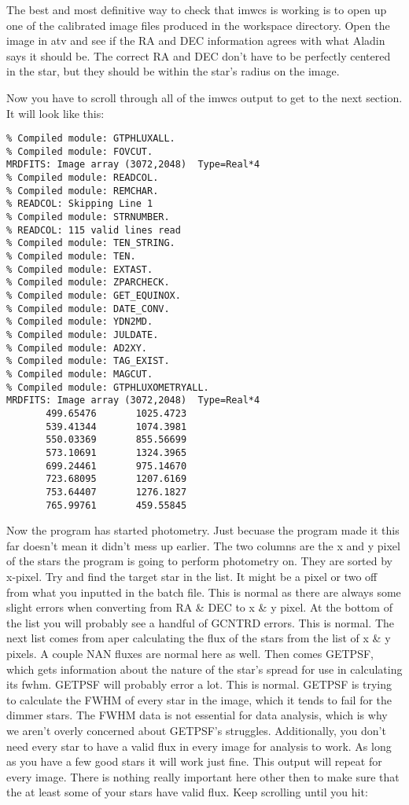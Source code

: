 \documentclass[10pt,preprint]{aastex}
\begin{document}
The best and most definitive way to check that imwcs is working is to open up one of the calibrated image files produced in the workspace directory. Open the image in atv and see if the RA and DEC information agrees with what Aladin says it should be. The correct RA and DEC don't have to be perfectly centered in the star, but they  should be within the star's radius on the image.

Now you have to scroll through all of the imwcs output to get to the next section. It will look like this:

\begin{verbatim}
% Compiled module: GTPHLUXALL.
% Compiled module: FOVCUT.
MRDFITS: Image array (3072,2048)  Type=Real*4
% Compiled module: READCOL.
% Compiled module: REMCHAR.
% READCOL: Skipping Line 1
% Compiled module: STRNUMBER.
% READCOL: 115 valid lines read
% Compiled module: TEN_STRING.
% Compiled module: TEN.
% Compiled module: EXTAST.
% Compiled module: ZPARCHECK.
% Compiled module: GET_EQUINOX.
% Compiled module: DATE_CONV.
% Compiled module: YDN2MD.
% Compiled module: JULDATE.
% Compiled module: AD2XY.
% Compiled module: TAG_EXIST.
% Compiled module: MAGCUT.
% Compiled module: GTPHLUXOMETRYALL.
MRDFITS: Image array (3072,2048)  Type=Real*4
       499.65476       1025.4723
       539.41344       1074.3981
       550.03369       855.56699
       573.10691       1324.3965
       699.24461       975.14670
       723.68095       1207.6169
       753.64407       1276.1827
       765.99761       459.55845
\end{verbatim}

Now the program has started photometry. Just becuase the program made it this far doesn't mean it didn't mess up earlier. The two columns are the x and y pixel of the stars the program is going to perform photometry on. They are sorted by x-pixel. Try and find the target star in the list. It might be a pixel or two off from what you inputted in the batch file. This is normal as there are always some slight errors when converting from RA \& DEC to x \& y pixel. At the bottom of the list you will probably see a handful of GCNTRD errors. This is normal. The next list comes from aper calculating the flux of the stars from the list of x \& y pixels. A couple NAN fluxes are normal here as well. Then comes GETPSF, which gets information about the nature of the star's spread for use in calculating its fwhm. GETPSF will probably error a lot. This is normal. GETPSF is trying to calculate the FWHM of every star in the image, which it tends to fail for the dimmer stars. The FWHM data is not essential for data analysis, which is why we aren't overly concerned about GETPSF's struggles. Additionally, you don't need every star to have a valid flux in every image for analysis to work. As long as you have a few good stars it will work just fine. This output will repeat for every image. There is nothing really important here other then to make sure that the at least some of your stars have valid flux. Keep scrolling until you hit:
\end{document}
